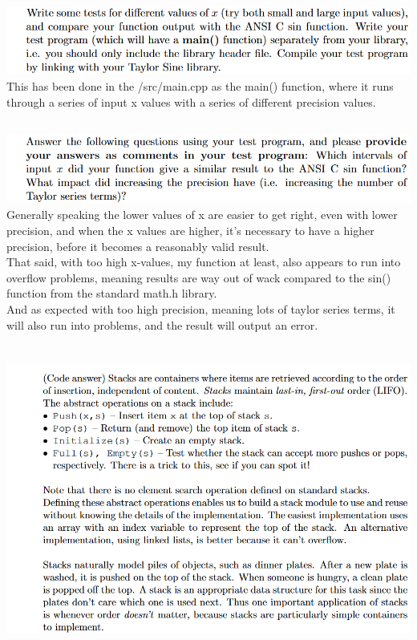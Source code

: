 \documentclass{article}
\begin{document}
\subsection{}
\includegraphics[width=\linewidth, keepaspectratio=true]{task1b}
This has been done in the /src/main.cpp as the main() function, where it runs through a series of input x values with
a series of different precision values.

\subsection{}
\includegraphics[width=\linewidth, keepaspectratio=true]{task1c}
Generally speaking the lower values of x are easier to get right, even with lower precision, and when the x values are higher, it's necessary
to have a higher precision, before it becomes a reasonably valid result.\\
That said, with too high x-values, my function at least, also appears to run into overflow problems, meaning results are way out of wack compared to
the sin() function from the standard math.h library.\\
And as expected with too high precision, meaning lots of taylor series terms, it will also run into problems, and the result 
will output an error.


\section{}
\includegraphics[width=\linewidth, keepaspectratio=true]{task2}
\end{document}
